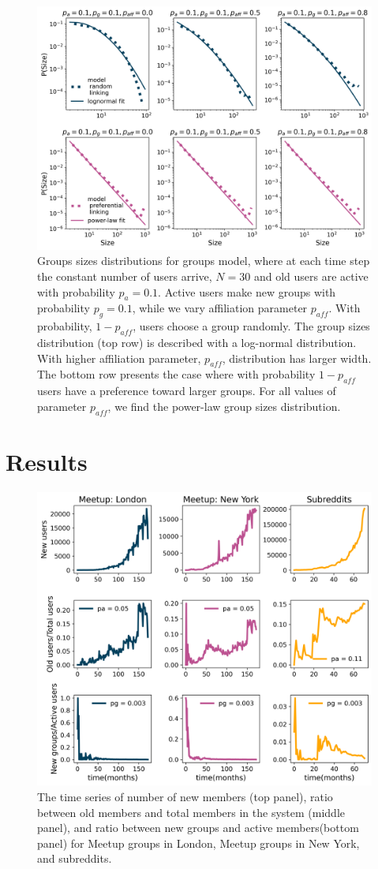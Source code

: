 \begin{figure}[H]
	\centering
	\includegraphics[width=0.8\linewidth]{figures/model_N30.png}
	\caption{Groups sizes distributions for groups model, where at each time step the constant number of users arrive, $N=30$ and old users are active with probability $p_a=0.1$. Active users make new groups with probability $p_g=0.1$, while we vary affiliation parameter $p_{aff}$. With probability, $1-p_{aff}$, users choose a group randomly. The group sizes distribution (top row) is described with a log-normal distribution. With higher affiliation parameter, $p_{aff}$, distribution has larger width. The bottom row presents the case where with probability $1-p_{aff}$ users have a preference toward larger groups. For all values of parameter $p_{aff}$, we find the power-law group sizes distribution.}
	\label{fig:model_comp}
\end{figure}


\clearpage
\newpage
\section{Results}
\begin{figure}[H]
	\centering
	\includegraphics[width=0.8\linewidth]{Figures/figures/Fig3.png}
	\caption{The time series of number of new members (top panel), ratio between old members and total members in the system (middle panel), and ratio between new groups and active members(bottom panel) for Meetup groups in London,  Meetup groups in New York, and subreddits. }
	\label{fig:fig5}
\end{figure}






